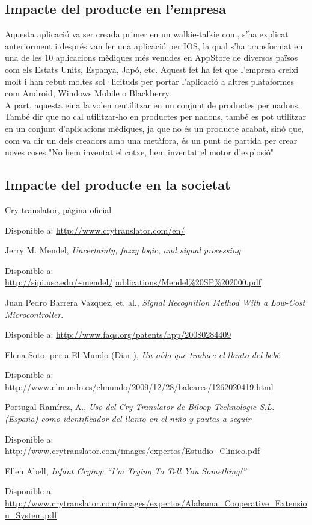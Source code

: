 \documentclass[11pt,a4paper]{article}
\begin{document}
\subsection{\textsf{Impacte del producte en l'empresa}}
\label{impacte-empresa}
Aquesta aplicació va ser creada primer en un walkie-talkie com, s'ha explicat anteriorment i després van fer una aplicació per IOS, la qual s'ha transformat en una de les 10 aplicacions mèdiques més venudes en AppStore de diversos països com els Estats Units, Espanya, Japó, etc. Aquest fet ha fet que l'empresa creixi molt i han rebut moltes sol·licituds per portar l'aplicació a altres plataformes com Android, Windows Mobile o Blackberry.\\
A part, aquesta eina la volen reutilitzar en un conjunt de productes per nadons. També dir que no cal utilitzar-ho en productes per nadons, també es pot utilitzar en un conjunt d'aplicacions mèdiques, ja que no és un producte acabat, sinó que, com va dir un dels creadors amb una metàfora, és un punt de partida per crear noves coses "No hem inventat el cotxe, hem inventat el motor d'explosió"

\subsection{\textsf{Impacte del producte en la societat}}
\label{impacte-societat}

\clearpage
\begin{thebibliography}{1}

 Cry translator, pàgina oficial

Disponible a: \url{http://www.crytranslator.com/en/}

 Jerry M. Mendel, \emph{Uncertainty, fuzzy logic, and signal processing}

Disponible a: \url{http://sipi.usc.edu/~mendel/publications/Mendel%20SP%202000.pdf}

 Juan Pedro Barrera Vazquez, et. al., \emph{Signal Recognition Method With a Low-Cost Microcontroller}. 

Disponible a: \url{http://www.faqs.org/patents/app/20080284409}

 Elena Soto, per a El Mundo (Diari), \emph{Un oído que traduce el llanto del bebé}

Disponible a: \url{http://www.elmundo.es/elmundo/2009/12/28/baleares/1262020419.html}

 Portugal Ramírez, A., \emph{Uso del Cry Translator de Biloop Technologic S.L. (España) como identificador del llanto en el niño y pautas a seguir }

Disponible a: \url{http://www.crytranslator.com/images/expertos/Estudio\_Clinico.pdf}

 Ellen Abell, \emph{Infant Crying: ``I’m Trying To Tell You Something!''}

Disponible a: \url{http://www.crytranslator.com/images/expertos/Alabama\_Cooperative\_Extension\_System.pdf}
\end{thebibliography}
\end{document}
